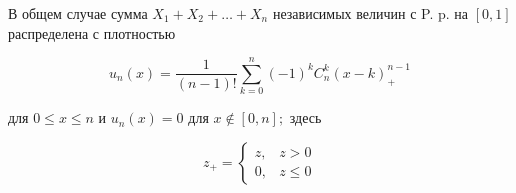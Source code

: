 \documentclass[10pt]{article}
\begin{document}
В общем случае сумма $X_{1}+X_{2}+\ldots+X_{n}$ независимых величин с P. p. на $[0,1]$ распределена с плотностью



\[

u_{n}(x)=\frac{1}{(n-1) !} \sum_{k=0}^{n}(-1)^{k} C_{n}^{k}(x-k)_{+}^{n-1}

\]



для $0 \leqslant x \leqslant n$ и $u_{n}(x)=0$ для $x \notin[0, n] ;$ здесь



\[

z_{+}= \begin{cases}z, & z>0 \\ 0, & z \leqslant 0\end{cases}

\]
\end{document}
